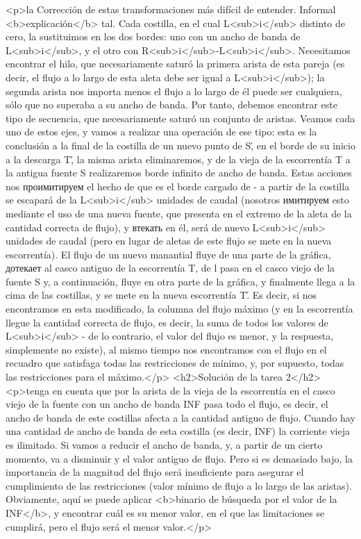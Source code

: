 <p>la Corrección de estas transformaciones más difícil de entender. Informal <b>explicación</b> tal. Cada costilla, en el cual L<sub>i</sub> distinto de cero, la sustituimos en los dos bordes: uno con un ancho de banda de L<sub>i</sub>, y el otro con R<sub>i</sub>-L<sub>i</sub>. Necesitamos encontrar el hilo, que necesariamente saturó la primera arista de esta pareja (es decir, el flujo a lo largo de esta aleta debe ser igual a L<sub>i</sub>); la segunda arista nos importa menos el flujo a lo largo de él puede ser cualquiera, sólo que no superaba a su ancho de banda. Por tanto, debemos encontrar este tipo de secuencia, que necesariamente saturó un conjunto de aristas. Veamos cada uno de estos ejes, y vamos a realizar una operación de ese tipo: esta es la conclusión a la final de la costilla de un nuevo punto de S\', en el borde de su inicio a la descarga T\', la misma arista eliminaremos, y de la vieja de la escorrentía T a la antigua fuente S realizaremos borde infinito de ancho de banda. Estas acciones nos проимитируем el hecho de que es el borde cargado de - a partir de la costilla se escapará de la L<sub>i</sub> unidades de caudal (nosotros имитируем esto mediante el uso de una nueva fuente, que presenta en el extremo de la aleta de la cantidad correcta de flujo), y втекать en él, será de nuevo L<sub>i</sub> unidades de caudal (pero en lugar de aletas de este flujo se mete en la nueva escorrentía). El flujo de un nuevo manantial fluye de una parte de la gráfica, дотекает al casco antiguo de la escorrentía T, de l pasa en el casco viejo de la fuente S y, a continuación, fluye en otra parte de la gráfica, y finalmente llega a la cima de las costillas, y se mete en la nueva escorrentía T\'. Es decir, si nos encontramos en esta modificado, la columna del flujo máximo (y en la escorrentía llegue la cantidad correcta de flujo, es decir, la suma de todos los valores de L<sub>i</sub> - de lo contrario, el valor del flujo es menor, y la respuesta, simplemente no existe), al mismo tiempo nos encontramos con el flujo en el recuadro que satisfaga todas las restricciones de mínimo, y, por supuesto, todas las restricciones para el máximo.</p>
<h2>Solución de la tarea 2</h2>
<p>tenga en cuenta que por la arista de la vieja de la escorrentía en el casco viejo de la fuente con un ancho de banda INF pasa todo el flujo, es decir, el ancho de banda de este costillas afecta a la cantidad antiguo de flujo. Cuando hay una cantidad de ancho de banda de esta costilla (es decir, INF) la corriente vieja es ilimitado. Si vamos a reducir el ancho de banda, y, a partir de un cierto momento, va a disminuir y el valor antiguo de flujo. Pero si es demasiado bajo, la importancia de la magnitud del flujo será insuficiente para asegurar el cumplimiento de las restricciones (valor mínimo de flujo a lo largo de las aristas). Obviamente, aquí se puede aplicar <b>binario de búsqueda por el valor de la INF</b>, y encontrar cuál es su menor valor, en el que las limitaciones se cumplirá, pero el flujo será el menor valor.</p>